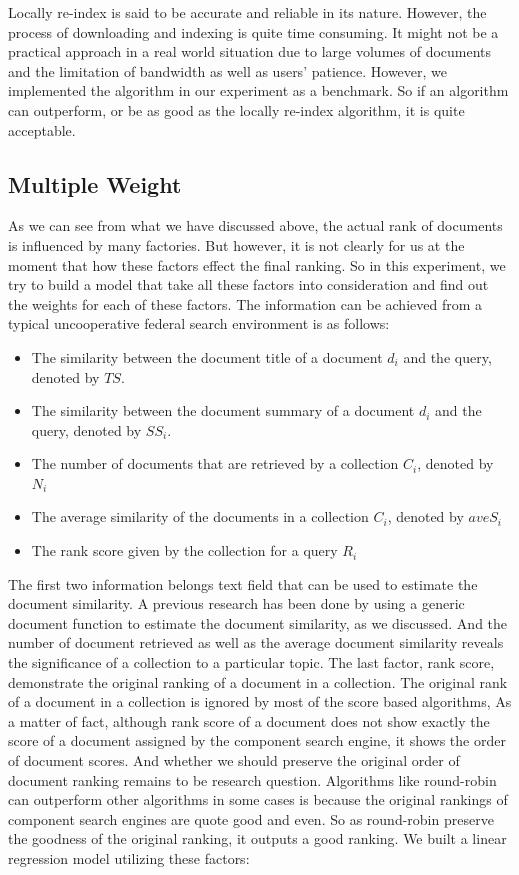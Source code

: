 Locally re-index is said to be accurate and reliable in its nature. However, the process of downloading and indexing is quite time consuming. It might not be a practical approach in a real world situation due to large volumes of documents and the limitation of bandwidth as well as users' patience. However, we implemented the algorithm in our experiment as a benchmark. So if an algorithm can outperform, or  be as good as the locally re-index algorithm, it is quite acceptable.
   

\subsection{Multiple Weight}

As we can see from what we have discussed above, the actual rank of documents is influenced by many factories. But however, it is not clearly for us at the moment that how these factors effect the final ranking. So in this experiment, we try to build a model that take all these factors into consideration and find out the weights for each of these factors.
The information can be achieved from a typical uncooperative federal search environment is as follows:
\begin{itemize}
\item
The similarity between the document title of a document $d_i$ and the query, denoted by $TS$.
\item
The similarity between the document summary of a document $d_i$ and the query, denoted by $SS_i$.
\item
The number of documents that are retrieved by a collection $C_i$, denoted by $N_i$
\item
The average similarity of the documents in a collection $C_i$, denoted by $aveS_i$
\item
The rank score given by the collection for a query $R_i$
\end{itemize}
The first two information belongs text field that can be used to estimate the document similarity. A previous research has been done by \cite{Rasolofo2003} using a generic document function to estimate the document similarity, as we discussed. And the number of document retrieved as well as the average document similarity reveals the significance of a collection to a particular topic. The last factor, rank score, demonstrate the original ranking of a document in a collection. The original rank of a document in a collection is ignored by most of the score based algorithms, As a matter of fact, although rank score of a document does not show exactly the score of a document assigned by the component search engine, it shows the order of document scores. And whether we should preserve the original order of document ranking remains to be research question. Algorithms like round-robin can outperform other algorithms in some cases is because the original rankings of component search engines are quote good and even. So as round-robin preserve the goodness of the original ranking, it outputs a good ranking. We built a linear regression model utilizing these factors: 

